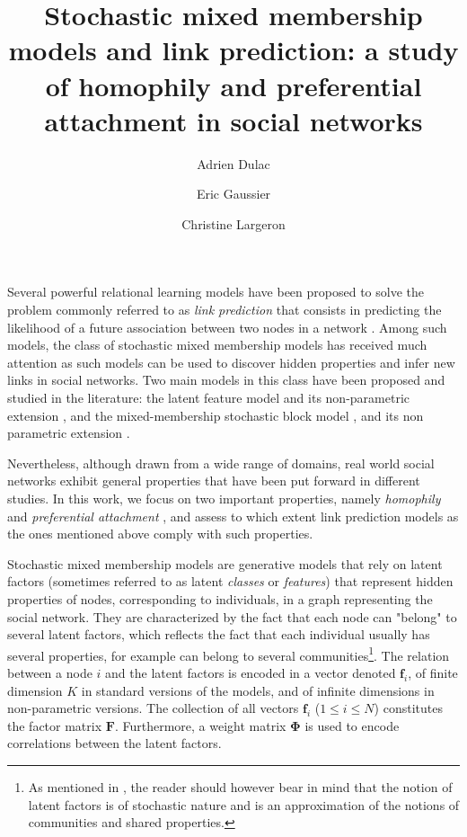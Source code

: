 \documentclass[9pt,twocolumn,twoside]{pnas-new}
\title{Stochastic mixed membership models and link prediction: a study of homophily and preferential attachment in social networks}
\author[a,b]{Adrien Dulac}
\author[a]{Eric Gaussier}
\author[b,1]{Christine Largeron}
\affil[a]{Univ. Grenoble Alpes, CNRS, Grenoble INP, LIG - F-38000 Grenoble}
\affil[b]{Universit\'e Jean Monnet, Laboratoire Hubert Curien - F-42000 Saint-Etienne}
\newcommand{\mat}[1]{\mathbf{#1}}
\begin{document}
\verticaladjustment{-2pt}

\maketitle
\thispagestyle{firststyle}

\label{sec:intro}

Several powerful relational learning models have been proposed to solve the problem commonly referred to as \textit{link prediction} that consists in predicting the likelihood of a future association between two nodes in a network \cite{Liben-Nowell07, HassanZaki11}. Among such models, the class of stochastic mixed membership models has received much attention as such models can be used to discover hidden properties and infer new links in social networks. Two main models in this class have been proposed and studied in the literature: the latent feature model \cite{BMF} and its non-parametric extension \cite{ILFRM}, and the mixed-membership stochastic block model \cite{MMSB}, and its non parametric extension \cite{iMMSB,diMMSB}.

Nevertheless, although drawn from a wide range of domains, real world social networks exhibit general properties that have been put forward in different studies. In this work, we focus on two important properties, namely \textit{homophily} and \textit{preferential attachment} \cite{Newman2010, Barabasi2003}, and assess to which extent link prediction models as the ones mentioned above comply with such properties.

Stochastic mixed membership models are generative models that rely on latent factors (sometimes referred to as latent \textit{classes} or \textit{features}) that represent hidden properties of nodes, corresponding to individuals, in a graph representing the social network. They are characterized by the fact that each node can "belong" to several latent factors, which reflects the fact that each individual usually has several properties, for example can belong to several communities\footnote{As mentioned in \cite{goldenberg2010survey}, the reader should however bear in mind that the notion of latent factors is of stochastic nature and is an approximation of the notions of communities and shared properties.}. The relation between a node $i$ and the latent factors is encoded in a vector denoted $\mat{f}_{i}$, of finite dimension $K$ in standard versions of the models, and of infinite dimensions in  non-parametric versions. The collection of all vectors $\mat{f}_{i}$ ($1 \le i \le N$) constitutes the factor matrix $\mat{F}$. Furthermore, a weight matrix $\mat{\Phi}$ is used to encode correlations between the latent factors.
\end{document}
